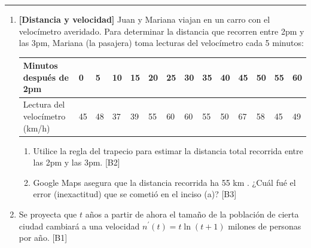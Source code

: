 \documentclass[10pt]{exam}
\begin{document}
\addpoints

\noindent
\rule[2ex]{\textwidth}{2pt}


\begin{enumerate}
\normalsize
\setlength{\columnsep}{10mm}



\item \textbf{[Distancia y velocidad]}  Juan y Mariana viajan en un carro con el velocímetro averidado. Para determinar la distancia que recorren entre 2pm y las 3pm, Mariana (la pasajera) toma lecturas del velocímetro cada 5 minutos:

\begin{center}

\begin{tabular}{|l|l|l|l|l|l|l|l|l|l|l|l|l|l|}
\hline
Minutos después de 2pm  & 0  & 5  & 10 & 15 & 20 & 25 & 30 & 35 & 40 & 45 & 50 & 55 & 60 \\ \hline
Lectura del velocímetro (km/h) & 45 & 48 & 37 & 39 & 55 & 60 & 60 & 55 & 50 & 67 & 58 & 45 & 49 \\ \hline
\end{tabular}
\end{center}
\begin{enumerate}
    \item Utilice la regla del trapecio para estimar la distancia total recorrida entre las 2pm y las 3pm. \hfill{[B2]}
    
   
    \item Google Maps  asegura que la distancia recorrida ha 55 km .  ¿Cuál fué el error (inexactitud) que se cometió en el inciso (a)?  \hfill{[B3]}
    
\end{enumerate}

\item Se proyecta que $t$ años a partir de ahora el tamaño de la población de cierta ciudad cambiará a una velocidad $n^{\prime}(t)=t\ln{(t+1)}$ milones de personas por año.  \hfill{[B1]}


\end{enumerate}
\end{document}

